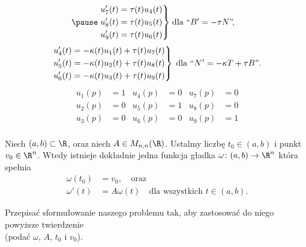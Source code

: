 \begin{frame}[<+->]
\begin{align*}
\pause\left.\begin{aligned}      
u_7'(t)&=\tau(t)u_4(t)\\
u_8'(t)&=\tau(t)u_5(t)\\
u_9'(t)&=\tau(t)u_6(t)
\end{aligned}\right\}&\;\text{dla }``B'=-\tau N\text{''}\!,
\end{align*}
\vspace*{-0.1in}
\pause\begin{equation*}
\left.\begin{aligned}      
u_4'(t)&=-\kappa(t)u_1(t)+\tau(t)u_7(t)\\
u_5'(t)&=-\kappa(t)u_2(t)+\tau(t)u_8(t)\\
u_6'(t)&=-\kappa(t)u_3(t)+\tau(t)u_9(t)
\end{aligned}\right\}\;\text{dla }``N\hspace{0.5pt}'=-\kappa T+\tau B\text{''}.
\end{equation*}
\vspace*{-0.2in}
\pause \begin{align*}
u_1(p)&=1 & u_4(p)&=0 & u_7(p)&=0\\ 
u_2(p)&=0 & u_5(p)&=1 & u_8(p)&=0\\
u_3(p)&=0 & u_6(p)&=0 & u_9(p)&=1\\ 
 \end{align*}

\end{frame}
\begin{frame}[<+->]
\begin{twierdzenie}\label{thm:dif-eq-solution}
Niech $(a,b)\subset \R$, oraz  niech $A\in M_{n,n}(\R)$.  Ustalmy liczbę $t_0\in 
(a,b)$ i punkt $v_0\in \R^n$. Wtedy istnieje dokładnie jedna funkcja gładka 
$\omega\colon (a,b)\to \R^n$ która spełnia 
\begin{align*}
\omega(t_0)&=v_0,\quad\text{oraz}\\
\omega'(t)&=A\omega(t) \quad\text{dla wszystkich }t\in (a,b).
\end{align*}
\end{twierdzenie}

\begin{exercise}
Przepisać sformułowanie naszego problemu tak, aby zastosować do niego powyższe 
twierdzenie \\(podać $\omega$, $A$, $t_0$ i $v_0$). 
\end{exercise}

\end{frame}
